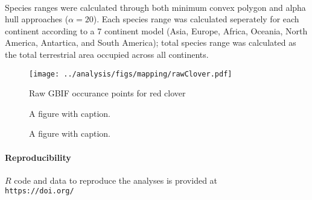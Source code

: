 \documentclass[12pt]{article}
\begin{document}
\paragraph{} Species ranges were calculated through both minimum convex polygon and alpha hull approaches ($\alpha = 20$). Each species range was calculated seperately for each continent according to a 7 continent model (Asia, Europe, Africa, Oceania, North America, Antartica, and South America); total species range was calculated as the total terrestrial area occupied across all continents.

\begin{figure}[h!]
  \begin{center}
    \texttt{[image: ../analysis/figs/mapping/rawClover.pdf]}
    \caption{Raw GBIF occurance points for red clover}
    \label{fig:fig1}
  \end{center}
\end{figure}


\begin{figure}[h!]
  \begin{center}
    \caption{A figure with caption. }
    \label{fig:fig2}
  \end{center}
\end{figure}


\begin{figure}[h!]
  \begin{center}
    \caption{A figure with caption. }
    \label{fig:fig3}
  \end{center}
\end{figure}






\paragraph*{Reproducibility}
$R$ code and data to reproduce the analyses is provided at \\
\texttt{https://doi.org/}
\end{document}
